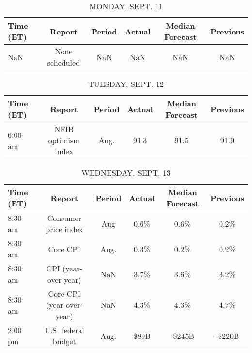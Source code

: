\documentclass{article}%
\begin{document}
%
\normalsize%


\begin{table}[htbp]%
\caption{MONDAY, SEPT. 11}%
\centering%
\begin{adjustbox}{width=1\textwidth}%
\begin{tabular}{lccccc}
\toprule
Time (ET) &         Report & Period & Actual & Median Forecast & Previous \\
\midrule
      NaN & None scheduled &    NaN &    NaN &             NaN &      NaN \\
\bottomrule
\end{tabular}
%
\end{adjustbox}%
\end{table}

%


\begin{table}[htbp]%
\caption{TUESDAY, SEPT. 12}%
\centering%
\begin{adjustbox}{width=1\textwidth}%
\begin{tabular}{lccccc}
\toprule
Time (ET) &              Report & Period & Actual & Median Forecast & Previous \\
\midrule
  6:00 am & NFIB optimism index &   Aug. &   91.3 &            91.5 &     91.9 \\
\bottomrule
\end{tabular}
%
\end{adjustbox}%
\end{table}

%


\begin{table}[htbp]%
\caption{WEDNESDAY, SEPT. 13}%
\centering%
\begin{adjustbox}{width=1\textwidth}%
\begin{tabular}{lccccc}
\toprule
Time (ET) &                    Report & Period & Actual & Median Forecast & Previous \\
\midrule
  8:30 am &      Consumer price index &    Aug &   0.6\% &            0.6\% &     0.2\% \\
  8:30 am &                  Core CPI &   Aug. &   0.3\% &            0.2\% &     0.2\% \\
  8:30 am &      CPI (year-over-year) &    NaN &   3.7\% &            3.6\% &     3.2\% \\
  8:30 am & Core CPI (year-over-year) &    NaN &   4.3\% &            4.3\% &     4.7\% \\
  2:00 pm &       U.S. federal budget &   Aug. &   \$89B &          -\$245B &   -\$220B \\
\bottomrule
\end{tabular}
%
\end{adjustbox}%
\end{table}
\end{document}
